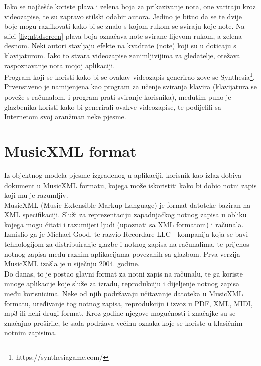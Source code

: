 \documentclass[times, utf8, zavrsni, numeric]{fer}
\begin{document}
Iako se najčešće koriste plava i zelena boja za prikazivanje nota, one variraju kroz videozapise, te su zapravo stilski odabir autora. Jedino je bitno da se te dvije boje mogu razlikovati kako bi se znalo s kojom rukom se sviraju koje note. Na slici \ref{fig:nttdscreen} plava boja označava note svirane lijevom rukom, a zelena desnom. Neki autori stavljaju efekte na kvadrate (note) koji su u doticaju s klavijaturom. Iako to stvara videozapise zanimljivijima za gledatelje, otežava raspoznavanje nota mojoj aplikaciji.\\

Program koji se koristi kako bi se ovakav videozapis generirao zove se Synthesia\footnote{https://synthesiagame.com/}. Prvenstveno je namijenjena kao program za učenje sviranja klavira (klavijatura se poveže s računalom, i program prati sviranje korisnika), međutim puno je glazbenika koristi kako bi generirali ovakve videozapise, te podijelili sa Internetom svoj aranžman neke pjesme.

\section{MusicXML format}
Iz objektnog modela pjesme izgrađenog u aplikaciji, korisnik kao izlaz dobiva dokument u MusicXML formatu, kojega može iskoristiti kako bi dobio notni zapis koji mu je razumljiv.\\

MusicXML (Music Extensible Markup Language) je format datoteke baziran na XML specifikaciji. Služi za reprezentaciju zapadnjačkog notnog zapisa u obliku kojega mogu čitati i razumijeti ljudi (upoznati sa XML formatom) i računala. Izmislio ga je Michael Good, te razvio Recordare LLC - kompanija koja se bavi tehnologijom za distribuiranje glazbe i notnog zapisa na računalima, te prijenos notnog zapisa među raznim aplikacijama povezanih sa glazbom\cite{recordare}. Prva verzija MusicXML izašla je u siječnju 2004. godine\cite{musicxml}.\\

Do danas, to je postao glavni format za notni zapis na računalu, te ga koriste mnoge aplikacije koje služe za izradu, reprodukciju i dijeljenje notnog zapisa među korisnicima. Neke od njih podržavaju učitavanje datoteka u MusicXML formatu, uređivanje tog notnog zapisa, reprodukciju i izvoz u PDF, XML, MIDI, mp3 ili neki drugi format. Kroz godine njegove mogućnosti i značajke su se značajno proširile, te sada podržava većinu oznaka koje se koriste u klasičnim notnim zapisima.\\
\end{document}
